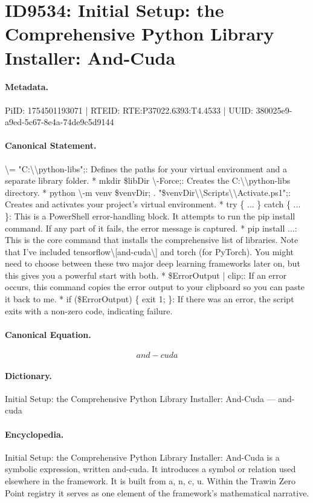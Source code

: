 \section*{ID9534: Initial Setup: the Comprehensive Python Library Installer: And-Cuda}
\paragraph{Metadata.}
PiID: 1754501193071 | RTEID: RTE:P37022.6393:T4.4533 | UUID: 380025e9-a9ed-5c67-8e4a-74de9c5d9144

\paragraph{Canonical Statement.}
\textbackslash{}= "C:\textbackslash{}\textbackslash{}python-libs";: Defines the paths for your virtual environment and a separate library folder. * mkdir \$libDir \textbackslash{}-Force;: Creates the C:\textbackslash{}\textbackslash{}python-libs directory. * python \textbackslash{}-m venv \$venvDir; . "\$venvDir\textbackslash{}\textbackslash{}Scripts\textbackslash{}\textbackslash{}Activate.ps1";: Creates and activates your project's virtual environment. * try \{ ... \} catch \{ ... \}: This is a PowerShell error-handling block. It attempts to run the pip install command. If any part of it fails, the error message is captured. * pip install ...: This is the core command that installs the comprehensive list of libraries. Note that I've included tensorflow\textbackslash{}[and-cuda\textbackslash{}] and torch (for PyTorch). You might need to choose between these two major deep learning frameworks later on, but this gives you a powerful start with both. * \$ErrorOutput | clip;: If an error occurs, this command copies the error output to your clipboard so you can paste it back to me. * if (\$ErrorOutput) \{ exit 1; \}: If there was an error, the script exits with a non-zero code, indicating failure.

\paragraph{Canonical Equation.}
\[
and-cuda
\]

\paragraph{Dictionary.}
Initial Setup: the Comprehensive Python Library Installer: And-Cuda — and-cuda

\paragraph{Encyclopedia.}
Initial Setup: the Comprehensive Python Library Installer: And-Cuda is a symbolic expression, written and-cuda. It introduces a symbol or relation used elsewhere in the framework. It is built from a, n, c, u. Within the Trawin Zero Point registry it serves as one element of the framework's mathematical narrative.

